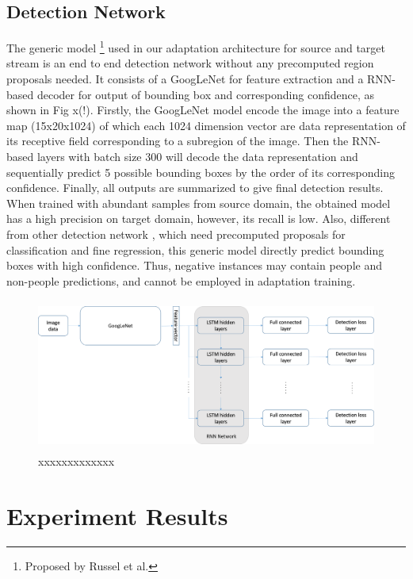 \documentclass[runningheads]{llncs}
\begin{document}
\subsection{Detection Network}
\label{section:Detection Network}
The generic model \footnote{Proposed by Russel et al.} used in our adaptation architecture for source and target stream is an end to end detection network without any precomputed region proposals needed. It consists of a GoogLeNet \cite{szegedy2015going} for feature extraction and a RNN-based decoder for output of bounding box and corresponding confidence, as shown in Fig x(!). Firstly, the GoogLeNet model encode the image into a feature map (15x20x1024) of which each 1024 dimension vector are data representation of its receptive field corresponding to a subregion of the image. Then the RNN-based layers with batch size 300 will decode the data representation and sequentially predict 5 possible bounding boxes by the order of its corresponding confidence. Finally, all outputs are summarized to give final detection results. When trained with abundant samples from source domain, the obtained model has a high precision on target domain, however, its recall is low. Also, different from other detection network \cite{girshick2015fast,vu2015context}, which need precomputed proposals for classification and fine regression, this generic model directly predict bounding boxes with high confidence. Thus, negative instances may contain people and non-people predictions, and cannot be employed in adaptation training.

\begin{figure}
\centering
\includegraphics[height=5cm]{images/reinspect.png}
\caption{xxxxxxxxxxxxx}
\label{fig:reinspect}
\end{figure}


\section{Experiment Results}
\label{section:Experiment Results}
\end{document}
